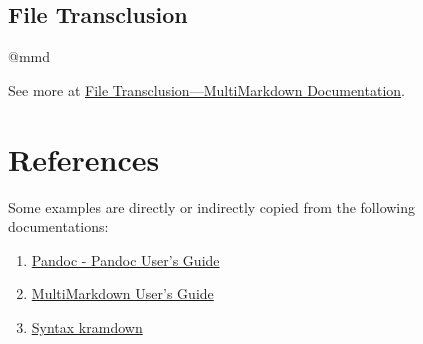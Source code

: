 \documentclass[]{article}
\providecommand{\tightlist}{%
  \setlength{\itemsep}{0pt}\setlength{\parskip}{0pt}}
\begin{document}
\subsection{File Transclusion}\label{file-transclusion}

@mmd

See more at
\href{http://fletcher.github.io/MultiMarkdown-5/transclusion.html}{File
Transclusion---MultiMarkdown Documentation}.

\section{References}\label{references}

Some examples are directly or indirectly copied from the following
documentations:

\begin{enumerate}
\def\labelenumi{\arabic{enumi}.}
\tightlist
\item
  \href{http://pandoc.org/README.html}{Pandoc - Pandoc User's Guide}
\item
  \href{http://fletcher.github.io/MultiMarkdown-5/}{MultiMarkdown User's
  Guide}
\item
  \href{http://kramdown.gettalong.org/syntax.html\#tables}{Syntax
  \textbar{} kramdown}
\end{enumerate}
\end{document}
